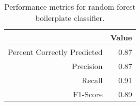 \begin{table}[ht]
\centering
\begin{tabular}{rr}
  \hline
 & Value \\ 
  \hline
Percent Correctly Predicted & 0.87 \\ 
  Precision & 0.87 \\ 
  Recall & 0.91 \\ 
  F1-Score & 0.89 \\ 
   \hline
\end{tabular}
\caption{Performance metrics for random forest boilerplate classifier.} 
\label{randomForest}
\end{table}

